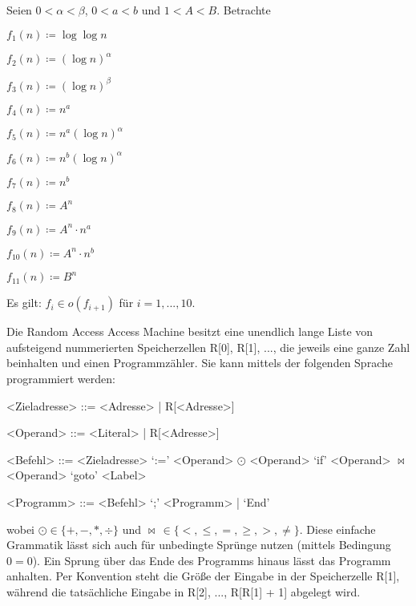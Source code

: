 \documentclass{cheat-sheet}
\begin{document}
\begin{satz}
  Seien $0 < \alpha < \beta$, $0 < a < b$ und $1 < A < B$. Betrachte
  \begin{itemize}
    \begin{multicols}{3}
      \item $f_1(n) \coloneqq \log \log n$
      \item $f_2(n) \coloneqq (\log n)^\alpha$
      \item $f_3(n) \coloneqq (\log n)^\beta$
      \item $f_4(n) \coloneqq n^a$
      \item $f_5(n) \coloneqq n^a (\log n)^\alpha$
      \item $f_6(n) \coloneqq n^b (\log n)^\alpha$
      \item $f_7(n) \coloneqq n^b$
      \item $f_8(n) \coloneqq A^n$
      \item $f_9(n) \coloneqq A^n \cdot n^a$
      \item $f_{10}(n) \coloneqq A^n \cdot n^b$
      \item $f_{11}(n) \coloneqq B^n$
    \end{multicols}
  \end{itemize}
  Es gilt: $f_i \in o(f_{i+1})$ für $i = 1, ..., 10$.
\end{satz}



\begin{defn}[RAM]
  Die Random Access Access Machine besitzt eine unendlich lange Liste von aufsteigend nummerierten Speicherzellen R[0], R[1], ..., die jeweils eine ganze Zahl beinhalten und einen Programmzähler. Sie kann mittels der folgenden Sprache programmiert werden:
  \begin{grammar}
    <Zieladresse> ::= <Adresse> | R[<Adresse>]

    <Operand> ::= <Literal> | R[<Adresse>]

    <Befehl> ::= <Zieladresse> `:=' <Operand> $\odot$ <Operand>
    \alt `if' <Operand> $\bowtie$ <Operand> `goto' <Label>

    <Programm> ::= <Befehl> `;' <Programm> | `End'
  \end{grammar}
  wobei $\odot \in \{ +, -, *, \div \}$ und $\bowtie \, \in \{ <, \leq, =, \geq, >, \not= \}$. Diese einfache Grammatik lässt sich auch für unbedingte Sprünge nutzen (mittels Bedingung $0 = 0$). Ein Sprung über das Ende des Programms hinaus lässt das Programm anhalten. Per Konvention steht die Größe der Eingabe in der Speicherzelle R[1], während die tatsächliche Eingabe in R[2], ..., R[R[1] + 1] abgelegt wird.
\end{defn}
\end{document}
